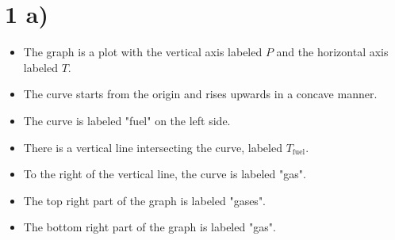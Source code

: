 \section*{1 a)}

\begin{itemize}
    \item The graph is a plot with the vertical axis labeled \( P \) and the horizontal axis labeled \( T \).
    \item The curve starts from the origin and rises upwards in a concave manner.
    \item The curve is labeled "fuel" on the left side.
    \item There is a vertical line intersecting the curve, labeled \( T_{\text{fuel}} \).
    \item To the right of the vertical line, the curve is labeled "gas".
    \item The top right part of the graph is labeled "gases".
    \item The bottom right part of the graph is labeled "gas".
\end{itemize}